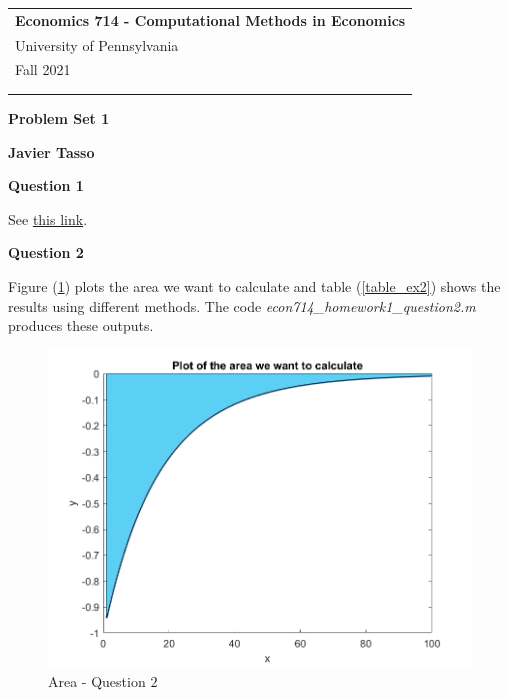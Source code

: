 \documentclass[a4paper,12pt]{article}
\begin{document}
\begin{tabular}{p{15.5cm}} 
{\large \bf Economics 714 - Computational Methods in Economics} \\
University of Pennsylvania \\ Fall 2021 \\ \\ 
\hline 
\\
\end{tabular} 

\vspace*{0.3cm} 

\begin{center} 
	{\Large \bf Problem Set 1} 
	\vspace{2mm}
	
        
	{\bf Javier Tasso} 
		
\end{center}  

\vspace{0.4cm}




    
     
    \textbf{Question 1} 
    \medskip

    See \href{https://github.com/javiertasso/econ714_hw1_tasso}{this link}. 

     
    
    
    \medskip
    \medskip
    \textbf{Question 2} 
    \medskip
    
    Figure (\ref{area_part2}) plots the area we want to calculate and table (\ref{table_ex2}) shows the results using different methods. The code \textit{econ714\_homework1\_question2.m} produces these outputs.  
    
    \begin{figure}[!htbp]
        \centering
       \includegraphics{econ714_homework1_question2_plot.png}
        \caption{Area - Question $2$} 
        \label{area_part2}
    \end{figure}
    
\end{document}
